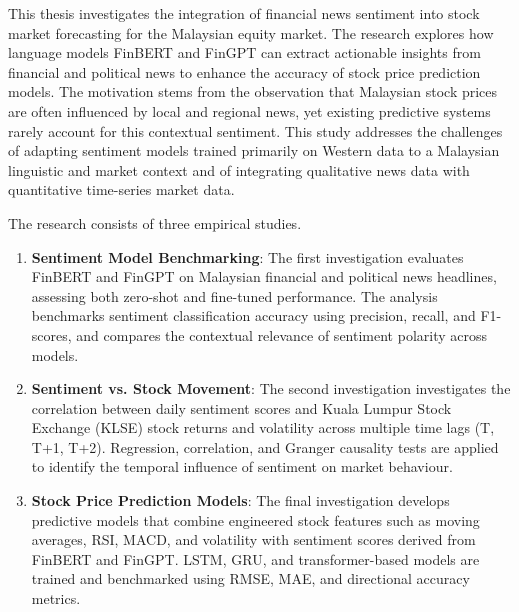 \documentclass[singlespace]{ucetd}
\date{2026}
\title{\thesistitle}
\author{\thesisauthor}
\begin{document}
\maketitle

\makecopyright

\abstract
This thesis investigates the integration of financial news sentiment into stock market forecasting for the Malaysian equity market. The research explores how language models FinBERT and FinGPT can extract actionable insights from financial and political news to enhance the accuracy of stock price prediction models. The motivation stems from the observation that Malaysian stock prices are often influenced by local and regional news, yet existing predictive systems rarely account for this contextual sentiment. This study addresses the challenges of adapting sentiment models trained primarily on Western data to a Malaysian linguistic and market context and of integrating qualitative news data with quantitative time-series market data. 

The research consists of three empirical studies.
\begin{enumerate}
    \item \textbf{Sentiment Model Benchmarking}: The first investigation evaluates FinBERT and FinGPT on Malaysian financial and political news headlines, assessing both zero-shot and fine-tuned performance. The analysis benchmarks sentiment classification accuracy using precision, recall, and F1-scores, and compares the contextual relevance of sentiment polarity across models. 
    
    \item \textbf{Sentiment vs. Stock Movement}: The second investigation investigates the correlation between daily sentiment scores and Kuala Lumpur Stock Exchange (KLSE) stock returns and volatility across multiple time lags (T, T+1, T+2). Regression, correlation, and Granger causality tests are applied to identify the temporal influence of sentiment on market behaviour.
    
    \item \textbf{Stock Price Prediction Models}: The final investigation develops predictive models that combine engineered stock features such as moving averages, RSI, MACD, and volatility with sentiment scores derived from FinBERT and FinGPT. LSTM, GRU, and transformer-based models are trained and benchmarked using RMSE, MAE, and directional accuracy metrics.
\end{enumerate}
\end{document}
